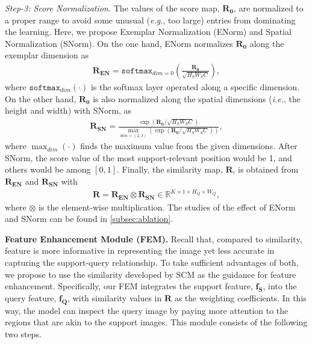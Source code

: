 \documentclass[10pt,twocolumn,letterpaper]{article}
\newcommand{\fs}{\bm{f_S}}
\newcommand{\fq}{\bm{f_Q}}
\newcommand{\Rraw}{\bm{R_0}}
\newcommand{\Rnorm}{\bm{R}}
\begin{document}
\textit{Step-3: Score Normalization.}
The values of the score map, $\Rraw$, are normalized to a proper range to avoid some unusual (\textit{e.g.}, too large) entries from dominating the learning.
Here, we propose Exemplar Normalization (ENorm) and Spatial Normalization (SNorm). 
On the one hand, ENorm normalizes $\Rraw$ along the exemplar dimension as
\begin{align}
  \bm{R_{EN}} = \mathtt{softmax}_{dim=0}(\frac{\Rraw}{\sqrt{H_S W_S C}}), 
\end{align}
where $\mathtt{softmax}_{dim}(\cdot)$ is the softmax layer operated along a specific dimension. 
On the other hand, $\Rraw$ is also normalized along the spatial dimensions (\textit{i.e.}, the height and width) with SNorm, as
\begin{align}
  \bm{R_{SN}}  = \frac{\exp(\Rraw / \sqrt{H_S W_S C})}{\max_{dim=(2,3)}(\exp(\Rraw / \sqrt{H_S W_S C}))}, 
\end{align}
where $\max_{dim}(\cdot)$ finds the maximum value from the given dimensions. 
After SNorm, the score value of the most support-relevant position would be 1, and others would be among $[0,1]$.
Finally, the similarity map, $\Rnorm$, is obtained from $\bm{R_{EN}}$ and $\bm{R_{SN}}$ with
\begin{align}
    \Rnorm = \bm{R_{EN}} \otimes \bm{R_{SN}} \in \mathbb{R}^{K \times 1 \times H_Q \times W_Q},
\end{align}
where $\otimes$ is the element-wise multiplication.
The studies of the effect of ENorm and SNorm can be found in \cref{subsec:ablation}.





\vspace{2pt}\noindent\textbf{Feature Enhancement Module (FEM).}
Recall that, compared to similarity, feature is more informative in representing the image yet less accurate in capturing the support-query relationship.
To take sufficient advantages of both, we propose to use the similarity developed by SCM as the guidance for feature enhancement.
Specifically, our FEM integrates the support feature, $\fs$, into the query feature, $\fq$, with similarity values in $\Rnorm$ as the weighting coefficients.
In this way, the model can inspect the query image by paying more attention to the regions that are akin to the support images.
This module consists of the following two steps.
\end{document}
